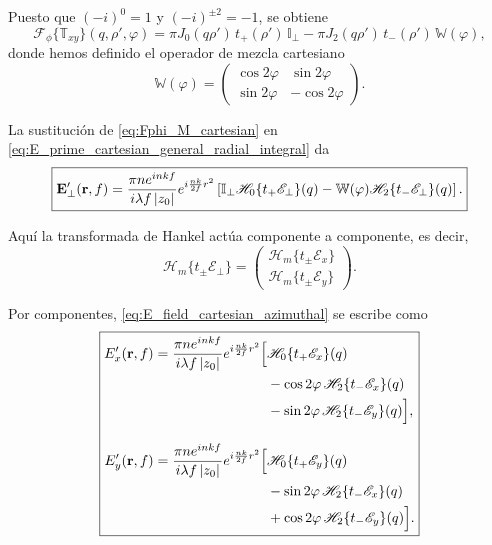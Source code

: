 Puesto que $(-i)^0=1$ y $(-i)^{\pm2}=-1$, se obtiene
\begin{equation}
\boxed{
  \mathscr F_\phi\{\mathbb T_{xy}\}
  (q,\rho',\varphi)
  =
  \pi J_0(q\rho')\,t_+(\rho')\,\mathbb I_\perp
  -
  \pi J_2(q\rho')\,t_-(\rho')\,\mathbb W(\varphi),
}
\label{eq:Fphi_M_cartesian}
\end{equation}
donde hemos definido el operador de mezcla cartesiano
\begin{equation}
\boxed{
  \mathbb W(\varphi)
  =
  \begin{pmatrix}
    \cos 2\varphi & \sin 2\varphi \\
    \sin 2\varphi & -\cos 2\varphi
  \end{pmatrix}.
}
\label{eq:def_W_mixing}
\end{equation}

La sustitución de \eqref{eq:Fphi_M_cartesian} en
\eqref{eq:E_prime_cartesian_general_radial_integral} da
\begin{equation}
\boxed{
\vb E'_\perp(\vb r,f)
=
\frac{\pi n e^{inkf}}{i\lambda f\,|z_0|}
e^{i\frac{nk}{2f}r^2}
\left[
\mathbb I_\perp
\mathscr H_0\{t_+\mathscr E_\perp\}(q)
-
\mathbb W(\varphi)
\mathscr H_2\{t_-\mathscr E_\perp\}(q)
\right].
}
\label{eq:E_field_cartesian_azimuthal}
\end{equation}

Aquí la transformada de Hankel actúa componente a componente, es decir,
\begin{equation}
\mathscr H_m\{t_\pm\mathscr E_\perp\}
=
\begin{pmatrix}
\mathscr H_m\{t_\pm\mathscr E_x\}\\
\mathscr H_m\{t_\pm\mathscr E_y\}
\end{pmatrix}.
\label{eq:Hankel_componentwise_cartesian}
\end{equation}

Por componentes, \eqref{eq:E_field_cartesian_azimuthal} se escribe como
\begin{equation}
\boxed{
\begin{aligned}
E'_x(\vb r,f)
=
\frac{\pi n e^{inkf}}{i\lambda f\,|z_0|}
e^{i\frac{nk}{2f}r^2}
\Big[
&
\mathscr H_0\{t_+\mathscr E_x\}(q)
\\
&
-
\cos2\varphi\,
\mathscr H_2\{t_-\mathscr E_x\}(q)
\\
&
-
\sin2\varphi\,
\mathscr H_2\{t_-\mathscr E_y\}(q)
\Big],
\\[1em]
E'_y(\vb r,f)
=
\frac{\pi n e^{inkf}}{i\lambda f\,|z_0|}
e^{i\frac{nk}{2f}r^2}
\Big[
&
\mathscr H_0\{t_+\mathscr E_y\}(q)
\\
&
-
\sin2\varphi\,
\mathscr H_2\{t_-\mathscr E_x\}(q)
\\
&
+
\cos2\varphi\,
\mathscr H_2\{t_-\mathscr E_y\}(q)
\Big].
\end{aligned}
}
\label{eq:Ex_Ey_Hankel_cartesian}
\end{equation}

